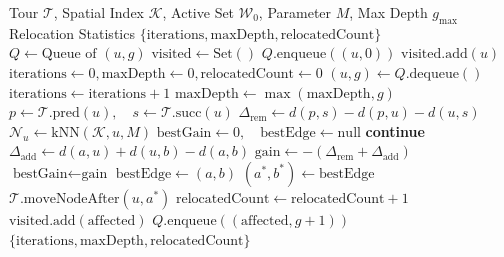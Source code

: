 \documentclass[11pt,a4paper]{article}
\theoremstyle{definition}
\begin{document}
\begin{algorithm}[H]
\caption{Ripple Wavefront Relocation Cascade}
\begin{algorithmic}[1]
\Require Tour $\mathcal{T}$, Spatial Index $\mathcal{K}$, Active Set $\mathcal{W}_0$, Parameter $M$, Max Depth $g_{\max}$
\Ensure Relocation Statistics $\{\text{iterations}, \text{maxDepth}, \text{relocatedCount}\}$
\State $Q \gets \text{Queue of } (u, g)$
\State $\text{visited} \gets \text{Set}()$
    \State $Q.\text{enqueue}((u, 0))$
    \State $\text{visited}.\text{add}(u)$
\EndFor
\State $\text{iterations} \gets 0, \text{maxDepth} \gets 0, \text{relocatedCount} \gets 0$
    \State $(u, g) \gets Q.\text{dequeue}()$
    \State $\text{iterations} \gets \text{iterations} + 1$
    \State $\text{maxDepth} \gets \max(\text{maxDepth}, g)$
    \State $p \gets \mathcal{T}.\text{pred}(u), \quad s \gets \mathcal{T}.\text{succ}(u)$
    \State $\Delta_{\text{rem}} \gets d(p, s) - d(p, u) - d(u, s)$
    \State $\mathcal{N}_u \gets \text{kNN}(\mathcal{K}, u, M)$
    \State $\text{bestGain} \gets 0, \quad \text{bestEdge} \gets \text{null}$
             \textbf{continue} \EndIf
            \State $\Delta_{\text{add}} \gets d(a, u) + d(u, b) - d(a, b)$
            \State $\text{gain} \gets -(\Delta_{\text{rem}} + \Delta_{\text{add}})$
                \State $\text{bestGain} \gets \text{gain}$
                \State $\text{bestEdge} \gets (a, b)$
            \EndIf
        \EndFor
    \EndFor
        \State $(a^*, b^*) \gets \text{bestEdge}$
        \State $\mathcal{T}.\text{moveNodeAfter}(u, a^*)$ 
        \State $\text{relocatedCount} \gets \text{relocatedCount} + 1$
                    \State $\text{visited}.\text{add}(\text{affected})$
                    \State $Q.\text{enqueue}((\text{affected}, g + 1))$
                \EndIf
            \EndFor
        \EndIf
    \EndIf
\EndWhile
\State \Return $\{\text{iterations}, \text{maxDepth}, \text{relocatedCount}\}$
\end{algorithmic}
\end{algorithm}
\end{document}
